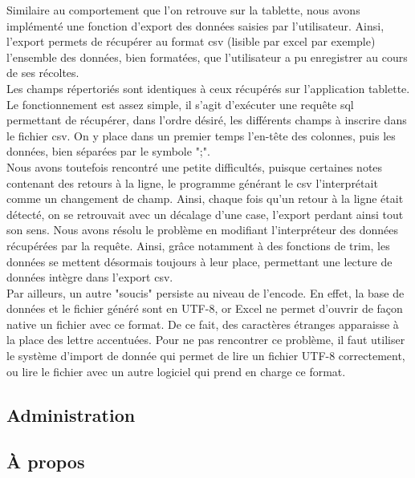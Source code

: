 \documentclass[twoside]{EPURapport}
\begin{document}
	Similaire au comportement que l'on retrouve sur la tablette, nous avons implémenté une fonction d'export des données saisies par l'utilisateur. Ainsi, l'export permets de récupérer au format csv (lisible par excel par exemple) l'ensemble des données, bien formatées, que l'utilisateur a pu enregistrer au cours de ses récoltes.\\
	
	Les champs répertoriés sont identiques à ceux récupérés sur l'application tablette.\\
	
	Le fonctionnement est assez simple, il s'agit d'exécuter une requête sql permettant de récupérer, dans l'ordre désiré, les différents champs à inscrire dans le fichier csv. On y place dans un premier temps l'en-tête des colonnes, puis les données, bien séparées par le symbole ";".\\
	
	Nous avons toutefois rencontré une petite difficultés, puisque certaines notes contenant des retours à la ligne, le programme générant le csv l'interprétait comme un changement de champ. Ainsi, chaque fois qu'un retour à la ligne était détecté, on se retrouvait avec un décalage d'une case, l'export perdant ainsi tout son sens. Nous avons résolu le problème en modifiant l'interpréteur des données récupérées par la requête. Ainsi, grâce notamment à des fonctions de trim, les données se mettent désormais toujours à leur place, permettant une lecture de données intègre dans l'export csv.\\
	
	Par ailleurs, un autre "soucis" persiste au niveau de l'encode. En effet, la base de données et le fichier généré sont en UTF-8, or Excel ne permet d'ouvrir de façon native un fichier avec ce format. De ce fait, des caractères étranges apparaisse à la place des lettre accentuées. Pour ne pas rencontrer ce problème, il faut utiliser le système d'import de donnée qui permet de lire un fichier UTF-8 correctement, ou  lire le fichier avec un autre logiciel qui prend en charge ce format.
		
		\subsection{Administration}
		
		\subsection{À propos}
		
\end{document}
